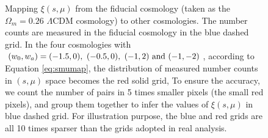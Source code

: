 \documentclass[iop]{emulateapj}
\begin{document}
\begin{figure}
   \caption{\label{fig_method}
   Mapping $\xi(s,\mu)$ from the fiducial cosmology (taken as the $\Omega_m=0.26$ $\Lambda$CDM cosmology) to other cosmologies. 
 The number counts are measured in the fiducial cosmology in the blue dashed grid.
 In the four cosmologies with $(w_0,w_a) = (-1.5,0),\ (-0.5,0),\ (-1,2)\ \rm and\ (-1,-2)$,
 according to Equation \ref{eq:smumap},
 the distribution of measured number counts in $(s, \mu)$ space becomes the red solid grid,
 To ensure the accuracy, we count the number of pairs in 5 times smaller pixels (the small red pixels), 
 and group them together to infer the values of $\xi(s, \mu)$ in blue dashed grid.
 For illustration purpose, 
  the blue and red grids are all 10 times sparser than the grids adopted in real analysis.
}
\end{figure}
\end{document}
